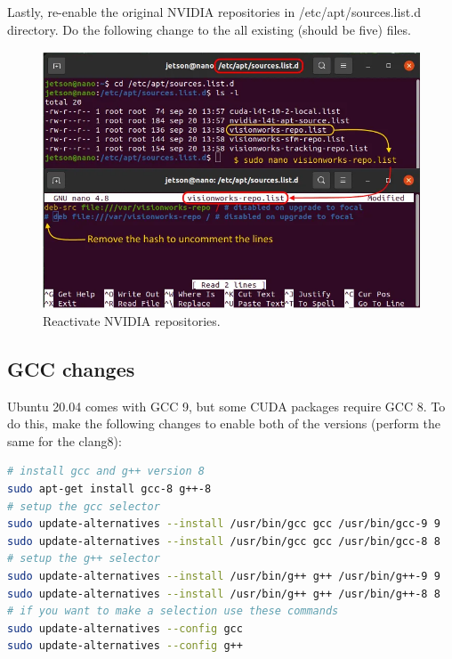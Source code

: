 Lastly, re-enable the original NVIDIA repositories in /etc/apt/sources.list.d directory. Do the following change to the all existing (should be five) files.
\begin{figure}[h]
    \centering
    \includegraphics[width=\textwidth]{figures/os_upgrades/nvidia_repositories.PNG}
    \caption{Reactivate NVIDIA repositories.}
\end{figure}
\subsection{GCC changes}
Ubuntu 20.04 comes with GCC 9, but some CUDA packages require GCC 8. To do this, make the following changes to enable both of the versions (perform the same for the clang8):
\begin{lstlisting}[language=bash, belowskip=-0.8 \baselineskip]
# install gcc and g++ version 8
sudo apt-get install gcc-8 g++-8
# setup the gcc selector
sudo update-alternatives --install /usr/bin/gcc gcc /usr/bin/gcc-9 9
sudo update-alternatives --install /usr/bin/gcc gcc /usr/bin/gcc-8 8
# setup the g++ selector
sudo update-alternatives --install /usr/bin/g++ g++ /usr/bin/g++-9 9
sudo update-alternatives --install /usr/bin/g++ g++ /usr/bin/g++-8 8
# if you want to make a selection use these commands
sudo update-alternatives --config gcc
sudo update-alternatives --config g++
\end{lstlisting}
